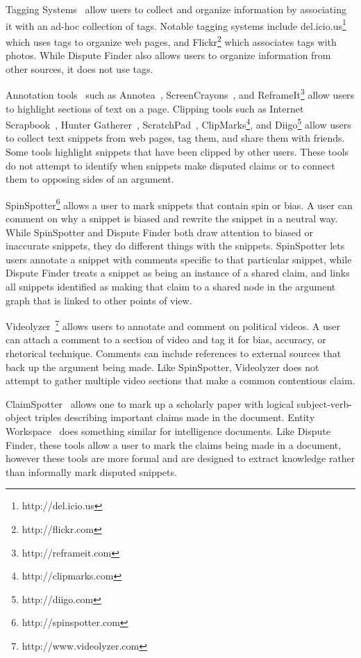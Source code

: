 \documentclass{www2010-submission}
\begin{document}
Tagging Systems~\cite{Marlow2006,Golder2006} allow users to collect and organize information by associating it with an ad-hoc collection of tags. Notable tagging systems include del.icio.us\footnote{http://del.icio.us} which uses tags to organize web pages, and Flickr\footnote{http://flickr.com} which associates tags with photos. While Dispute Finder also allows users to organize information from other sources, it does not use tags.

Annotation tools~\cite{Marshall1998} such as Annotea~\cite{Koivunen2001}, ScreenCrayons~\cite{Olsen2004}, and ReframeIt\footnote{http://reframeit.com} allow users to highlight sections of text on a page. Clipping tools such as Internet Scrapbook~\cite{Sugiura1998}, Hunter Gatherer~\cite{Schraefel2002}, ScratchPad~\cite{Gotz2007}, ClipMarks\footnote{http://clipmarks.com}, and Diigo\footnote{http://diigo.com} allow users to collect text snippets from web pages, tag them, and share them with friends. Some tools highlight snippets that have been clipped by other users. These tools do not attempt to identify when snippets make disputed claims or to connect them to opposing sides of an argument.

SpinSpotter\footnote{http://spinspotter.com} allows a user to mark snippets that contain spin or bias. A user can comment on why a snippet is biased and rewrite the snippet in a neutral way. While SpinSpotter and Dispute Finder both draw attention to biased or inaccurate snippets, they do different things with the snippets. SpinSpotter lets users annotate a snippet with comments specific to that particular snippet, while Dispute Finder treats a snippet as being an instance of a shared claim, and links all snippets identified as making that claim to a shared node in the argument graph that is linked to other points of view.

Videolyzer~\cite{Diakopoulos2008}\footnote{http://www.videolyzer.com} allows users to annotate and comment on political videos. A user can attach a comment to a section of video and tag it for bias, accuracy, or rhetorical technique. Comments can include references to external sources that back up the argument being made. Like SpinSpotter, Videolyzer does not attempt to gather multiple video sections that make a common contentious claim.

ClaimSpotter~\cite{Sereno2005,Sereno2004} allows one to mark up a scholarly paper with logical subject-verb-object triples describing important claims made in the document. Entity Workspace~\cite{Bier2006} does something similar for intelligence documents. Like Dispute Finder, these tools allow a user to mark the claims being made in a document, however these tools are more formal and are designed to extract knowledge rather than informally mark disputed snippets.
\end{document}
